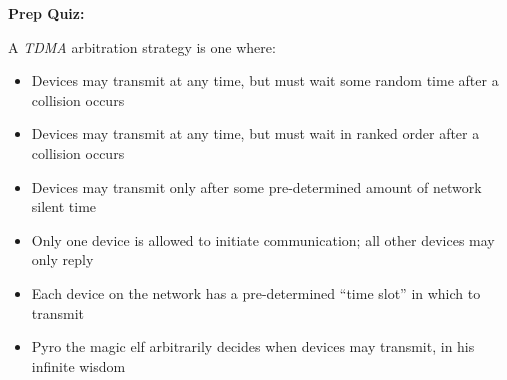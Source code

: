\vfil \eject

\noindent
{\bf Prep Quiz:}

A {\it TDMA} arbitration strategy is one where:

\begin{itemize}
\item{} Devices may transmit at any time, but must wait some random time after a collision occurs
\vskip 5pt 
\item{} Devices may transmit at any time, but must wait in ranked order after a collision occurs
\vskip 5pt 
\item{} Devices may transmit only after some pre-determined amount of network silent time
\vskip 5pt 
\item{} Only one device is allowed to initiate communication; all other devices may only reply
\vskip 5pt 
\item{} Each device on the network has a pre-determined ``time slot'' in which to transmit
\vskip 5pt 
\item{} Pyro the magic elf arbitrarily decides when devices may transmit, in his infinite wisdom
\end{itemize}



